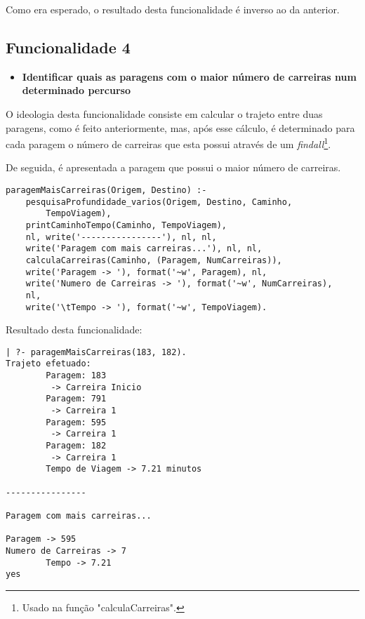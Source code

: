 \documentclass[a4paper,12pt]{report}
\begin{document}
\par Como era esperado, o resultado desta funcionalidade é inverso ao da anterior.

\vspace{1cm}

\subsection{Funcionalidade 4}
\begin{itemize}
    \item \textbf{Identificar quais as paragens com o maior número de carreiras num determinado percurso}
\end{itemize}

\par O ideologia desta funcionalidade consiste em calcular o trajeto entre duas paragens, como é feito anteriormente, mas, após esse cálculo, é determinado para cada paragem o número de carreiras que esta possui através de um \textit{findall}\footnote{Usado na função "calculaCarreiras".}.
\par De seguida, é apresentada a paragem que possui o maior número de carreiras.

\begin{verbatim}
paragemMaisCarreiras(Origem, Destino) :-
    pesquisaProfundidade_varios(Origem, Destino, Caminho, 
        TempoViagem),
    printCaminhoTempo(Caminho, TempoViagem),
    nl, write('----------------'), nl, nl,
    write('Paragem com mais carreiras...'), nl, nl,
    calculaCarreiras(Caminho, (Paragem, NumCarreiras)),
    write('Paragem -> '), format('~w', Paragem), nl,
    write('Numero de Carreiras -> '), format('~w', NumCarreiras),
    nl,
    write('\tTempo -> '), format('~w', TempoViagem).
\end{verbatim}  

\vspace{0.5cm}

\par Resultado desta funcionalidade:

\begin{verbatim}
| ?- paragemMaisCarreiras(183, 182).
Trajeto efetuado: 
        Paragem: 183
         -> Carreira Inicio
        Paragem: 791
         -> Carreira 1
        Paragem: 595
         -> Carreira 1
        Paragem: 182
         -> Carreira 1
        Tempo de Viagem -> 7.21 minutos

----------------

Paragem com mais carreiras...

Paragem -> 595
Numero de Carreiras -> 7
        Tempo -> 7.21
yes
\end{verbatim}
\end{document}
